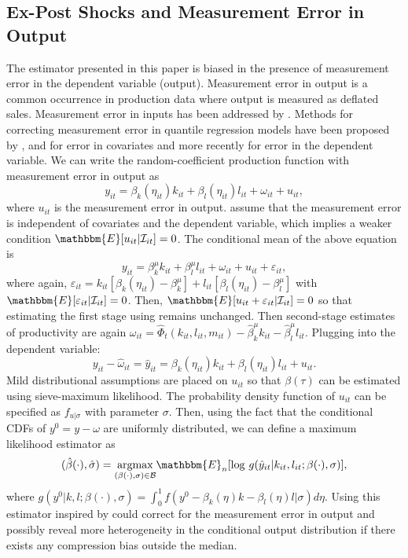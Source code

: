 \documentclass[12pt]{article}
\begin{document}
\begin{appendices}
\section{Ex-Post Shocks and Measurement Error in Output} \label{hausman}
The estimator presented in this paper is biased in the presence of measurement error in the dependent variable (output). Measurement error in output is a common occurrence in production data where output is measured as deflated sales. Measurement error in inputs has been addressed by \cite{song}. Methods for correcting measurement error in quantile regression models have been proposed by \cite{Schennach2008}, \cite{Firpo2017} and \cite{Wei2009} for error in covariates and more recently \cite{Hausman2021} for error in the dependent variable. We can write the random-coefficient production function with measurement error in output as
\begin{equation*} {}
y_{it}=\beta_{k}(\eta_{it})k_{it}+\beta_{l}(\eta_{it})l_{it}+\omega_{it}+u_{it},
\end{equation*}
where $u_{it}$ is the measurement error in output. \cite{Hausman2021} assume that the measurement error is independent of covariates and the dependent variable, which implies a weaker condition $\mathbbm{E}[u_{it}|\mathcal{I}_{it}]=0$. The conditional mean of the above equation is
\begin{equation*} 
y_{it}=\beta_{k}^{\mu}k_{it}+\beta_{l}^{\mu}l_{it}+\omega_{it}+u_{it}+\varepsilon_{it},
\end{equation*}
where again, $\varepsilon_{it}=k_{it}[\beta_{k}(\eta_{it})-\beta^{\mu}_{k}]+l_{it}[\beta_{l}(\eta_{it})-\beta^{\mu}_{l}]$ with $\mathbbm{E}[\varepsilon_{it}|\mathcal{I}_{it}]=0$. Then, $\mathbbm{E}[u_{it}+\varepsilon_{it}|\mathcal{I}_{it}]=0$ so that estimating the first stage using \cite{Ackerberg2015} remains unchanged. Then second-stage estimates of productivity are again $\omega_{it}=\hat{\Phi}_{t}(k_{it}, l_{it}, m_{it})-\hat{\beta}^{\mu}_{k}k_{it}-\hat{\beta}^{\mu}_{l}l_{it}$. Plugging into the dependent variable:
\begin{equation*}
y_{it}-\hat{\omega}_{it}=\hat{y}_{it}=\beta_{k}(\eta_{it})k_{it}+\beta_{l}(\eta_{it})l_{it}+u_{it}.
\end{equation*}
Mild distributional assumptions are placed on $u_{it}$ so that $\beta(\tau)$ can be estimated using sieve-maximum likelihood. The probability density function of $u_{it}$ can be specified as $f_{u|\sigma}$ with parameter $\sigma$. Then, using the fact that the conditional CDFs of $y^{0}=y-\omega$ are uniformly distributed, we can define a maximum likelihood estimator as
\begin{equation}
(\hat{\beta}(\cdot),\hat{\sigma})=\underset{(\beta(\cdot),\sigma)\in \mathcal{B}}{\operatorname{argmax}}\mathbbm{E}_{n}[\log\,g(\hat{y}_{it}|k_{it}, l_{it}; \beta(\cdot),\sigma)],
\end{equation}
where $g(y^{0}|k, l; \beta(\cdot),\sigma)=\int_{0}^{1}f(y^{0}-\beta_{k}(\eta)k-\beta_{l}(\eta)l|\sigma)d\eta$. Using this estimator inspired by \cite{Hausman2021} could correct for the measurement error in output and possibly reveal more heterogeneity in the conditional output distribution if there exists any compression bias outside the median.


\end{appendices}
\end{document}
